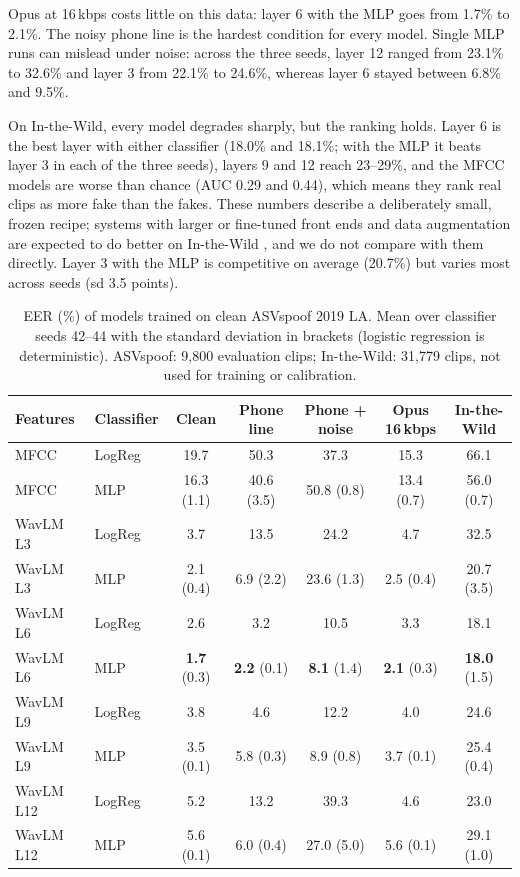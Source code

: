 \documentclass[10pt,a4paper]{article}
\begin{document}
Opus at 16\,kbps costs little on this data: layer 6 with the MLP goes from 1.7\% to 2.1\%. The noisy phone line is
the hardest condition for every model. Single MLP runs can mislead under noise: across the three seeds, layer 12
ranged from 23.1\% to 32.6\% and layer 3 from 22.1\% to 24.6\%, whereas layer 6 stayed between 6.8\% and 9.5\%.

On In-the-Wild, every model degrades sharply, but the ranking holds. Layer 6 is the best layer with either classifier (18.0\% and 18.1\%; with the MLP it beats layer 3 in each of the three seeds), layers 9 and 12 reach 23--29\%, and the MFCC models are worse than chance (AUC 0.29 and 0.44),
which means they rank real clips as more fake than the fakes. These numbers describe a deliberately small, frozen recipe; systems with larger or fine-tuned front ends and data augmentation are expected to do better on In-the-Wild \cite{pascu2024towards,tak2022automatic}, and we do not compare with them directly. Layer 3 with the MLP is competitive on average (20.7\%)
but varies most across seeds (sd 3.5 points).

\begin{table}[t]
\centering
\caption{EER (\%) of models trained on clean ASVspoof 2019 LA. Mean over classifier seeds 42--44 with the standard
deviation in brackets (logistic regression is deterministic). ASVspoof: 9,800 evaluation clips; In-the-Wild: 31,779
clips, not used for training or calibration.}
\label{tab:eer}
\small
\begin{tabular}{llccccc}
\toprule
Features & Classifier & Clean & Phone line & Phone + noise & Opus 16\,kbps & In-the-Wild \\
\midrule
MFCC & LogReg & 19.7 & 50.3 & 37.3 & 15.3 & 66.1 \\
MFCC & MLP & 16.3 (1.1) & 40.6 (3.5) & 50.8 (0.8) & 13.4 (0.7) & 56.0 (0.7) \\
\midrule
WavLM L3 & LogReg & 3.7 & 13.5 & 24.2 & 4.7 & 32.5 \\
WavLM L3 & MLP & 2.1 (0.4) & 6.9 (2.2) & 23.6 (1.3) & 2.5 (0.4) & 20.7 (3.5) \\
WavLM L6 & LogReg & 2.6 & 3.2 & 10.5 & 3.3 & 18.1 \\
WavLM L6 & MLP & \textbf{1.7} (0.3) & \textbf{2.2} (0.1) & \textbf{8.1} (1.4) & \textbf{2.1} (0.3) & \textbf{18.0} (1.5) \\
WavLM L9 & LogReg & 3.8 & 4.6 & 12.2 & 4.0 & 24.6 \\
WavLM L9 & MLP & 3.5 (0.1) & 5.8 (0.3) & 8.9 (0.8) & 3.7 (0.1) & 25.4 (0.4) \\
WavLM L12 & LogReg & 5.2 & 13.2 & 39.3 & 4.6 & 23.0 \\
WavLM L12 & MLP & 5.6 (0.1) & 6.0 (0.4) & 27.0 (5.0) & 5.6 (0.1) & 29.1 (1.0) \\
\bottomrule
\end{tabular}
\end{table}
\end{document}
